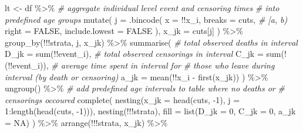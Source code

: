 \documentclass[10pt,twoside,reqno]{article}
\newenvironment{Shaded}{}{}
\newcommand{\AttributeTok}[1]{#1}
\newcommand{\CommentTok}[1]{\textit{#1}}
\newcommand{\ConstantTok}[1]{#1}
\newcommand{\DecValTok}[1]{#1}
\newcommand{\FunctionTok}[1]{#1}
\newcommand{\NormalTok}[1]{#1}
\newcommand{\OtherTok}[1]{#1}
\newcommand{\SpecialCharTok}[1]{#1}
\begin{document}
\begin{Shaded}
\begin{Highlighting}[]
\NormalTok{  lt }\OtherTok{\textless{}{-}}
\NormalTok{    df }\SpecialCharTok{\%\textgreater{}\%}
    \CommentTok{\# aggregate individual level event and censoring times}
    \CommentTok{\# into predefined age groups}
    \FunctionTok{mutate}\NormalTok{(}
      \AttributeTok{j =}
        \FunctionTok{.bincode}\NormalTok{(}
          \AttributeTok{x =} \SpecialCharTok{!!}\NormalTok{x\_i, }\AttributeTok{breaks =}\NormalTok{ cuts,}
          \CommentTok{\# [a, b)}
          \AttributeTok{right =} \ConstantTok{FALSE}\NormalTok{, }\AttributeTok{include.lowest =} \ConstantTok{FALSE}
\NormalTok{        ),}
      \AttributeTok{x\_jk =}
\NormalTok{        cuts[j]}
\NormalTok{    ) }\SpecialCharTok{\%\textgreater{}\%}
    \FunctionTok{group\_by}\NormalTok{(}\SpecialCharTok{!!!}\NormalTok{strata, j, x\_jk) }\SpecialCharTok{\%\textgreater{}\%}
    \FunctionTok{summarise}\NormalTok{(}
      \CommentTok{\# total observed deaths in interval}
      \AttributeTok{D\_jk =} \FunctionTok{sum}\NormalTok{(}\SpecialCharTok{!!}\NormalTok{event\_i),}
      \CommentTok{\# total observed censorings in interval}
      \AttributeTok{C\_jk =} \FunctionTok{sum}\NormalTok{(}\SpecialCharTok{!}\NormalTok{(}\SpecialCharTok{!!}\NormalTok{event\_i)),}
      \CommentTok{\# average time spent in interval for}
      \CommentTok{\# those who leave during interval (by death or censoring)}
      \AttributeTok{a\_jk =} \FunctionTok{mean}\NormalTok{(}\SpecialCharTok{!!}\NormalTok{x\_i }\SpecialCharTok{{-}} \FunctionTok{first}\NormalTok{(x\_jk))}
\NormalTok{    ) }\SpecialCharTok{\%\textgreater{}\%}
    \FunctionTok{ungroup}\NormalTok{() }\SpecialCharTok{\%\textgreater{}\%}
    \CommentTok{\# add predefined age intervals to table where no deaths or}
    \CommentTok{\# censorings occoured}
    \FunctionTok{complete}\NormalTok{(}
      \FunctionTok{nesting}\NormalTok{(}\AttributeTok{x\_jk =} \FunctionTok{head}\NormalTok{(cuts, }\SpecialCharTok{{-}}\DecValTok{1}\NormalTok{), }\AttributeTok{j =} \DecValTok{1}\SpecialCharTok{:}\FunctionTok{length}\NormalTok{(}\FunctionTok{head}\NormalTok{(cuts, }\SpecialCharTok{{-}}\DecValTok{1}\NormalTok{))),}
      \FunctionTok{nesting}\NormalTok{(}\SpecialCharTok{!!!}\NormalTok{strata),}
      \AttributeTok{fill =} \FunctionTok{list}\NormalTok{(}\AttributeTok{D\_jk =} \DecValTok{0}\NormalTok{, }\AttributeTok{C\_jk =} \DecValTok{0}\NormalTok{, }\AttributeTok{a\_jk =} \ConstantTok{NA}\NormalTok{)}
\NormalTok{    ) }\SpecialCharTok{\%\textgreater{}\%}
    \FunctionTok{arrange}\NormalTok{(}\SpecialCharTok{!!!}\NormalTok{strata, x\_jk) }\SpecialCharTok{\%\textgreater{}\%}

\end{Highlighting}
\end{Shaded}
\end{document}
